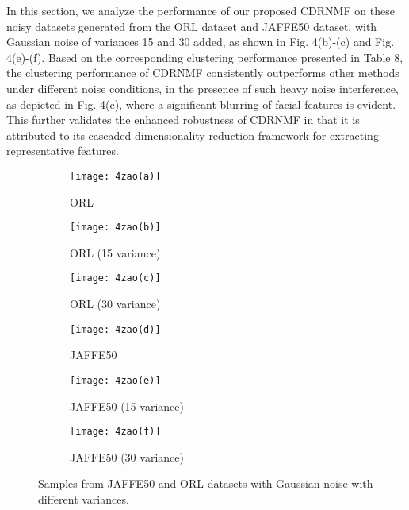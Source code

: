\documentclass[a4paper,fleqn]{cas-sc}
\begin{document}
In this section, we analyze the performance of our proposed CDRNMF on these noisy datasets generated from the ORL dataset and JAFFE50 dataset, with Gaussian noise of variances 15 and 30 added, as shown in Fig. 4(b)-(c) and Fig. 4(e)-(f). Based on the corresponding clustering performance presented in Table 8, the clustering performance of CDRNMF consistently outperforms other methods under different noise conditions, in the presence of such heavy noise interference, as depicted in Fig. 4(c), where a significant blurring of facial features is evident. This further validates the enhanced robustness of CDRNMF in that it is attributed to its cascaded dimensionality reduction framework for extracting representative features.
\begin{figure}[!t]
	\centering
	\begin{subfigure}[b]{.23\textwidth}
		\centering
		\texttt{[image: 4zao(a)]}
		\caption{ORL}\label{subfig:4zao(a)}
	\end{subfigure}
	\begin{subfigure}[b]{.23\textwidth}
		\centering
		\texttt{[image: 4zao(b)]}
		\caption{ORL (15 variance)}\label{subfig:4zao(b)}
	\end{subfigure}
	\begin{subfigure}[b]{.23\textwidth}
		\centering
		\texttt{[image: 4zao(c)]}
		\caption{ORL (30 variance)}\label{subfig:4zao(c)}
	\end{subfigure}
	
	\quad
	
	\begin{subfigure}[b]{.23\textwidth}
		\centering
		\texttt{[image: 4zao(d)]}
		\caption{JAFFE50}\label{subfig:4zao(d)}
	\end{subfigure}
	\begin{subfigure}[b]{.23\textwidth}
		\centering
		\texttt{[image: 4zao(e)]}
		\caption{JAFFE50 (15 variance)}\label{subfig:4zao(e)}
	\end{subfigure}
	\begin{subfigure}[b]{.23\textwidth}
		\centering
		\texttt{[image: 4zao(f)]}
		\caption{JAFFE50 (30 variance)}\label{subfig:4zao(f)}
	\end{subfigure}
	
	\caption{Samples from JAFFE50 and ORL datasets with Gaussian noise with different variances.}\label{fig:4zao}
\end{figure}
\end{document}
